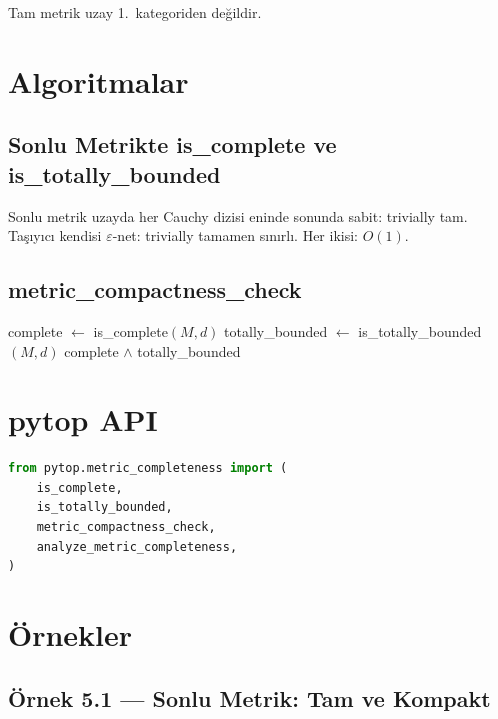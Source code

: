 \begin{theorem}
Tam metrik uzay 1.\ kategoriden değildir.
\end{theorem}

\section{Algoritmalar}

\subsection{Sonlu Metrikte is\_complete ve is\_totally\_bounded}

Sonlu metrik uzayda her Cauchy dizisi eninde sonunda sabit: trivially tam.
Taşıyıcı kendisi $\varepsilon$-net: trivially tamamen sınırlı.
Her ikisi: $O(1)$.

\subsection{metric\_compactness\_check}

\begin{algorithm}
\caption{MetricCompactnessCheck$(M, d)$}
\begin{algorithmic}[1]
\State complete $\leftarrow$ is\_complete$(M, d)$
\State totally\_bounded $\leftarrow$ is\_totally\_bounded$(M, d)$
\State \Return complete $\wedge$ totally\_bounded
\end{algorithmic}
\end{algorithm}

\section{pytop API}

\begin{lstlisting}[language=Python]
from pytop.metric_completeness import (
    is_complete,
    is_totally_bounded,
    metric_compactness_check,
    analyze_metric_completeness,
)
\end{lstlisting}

\section{Örnekler}

\subsection*{Örnek 5.1 — Sonlu Metrik: Tam ve Kompakt}

